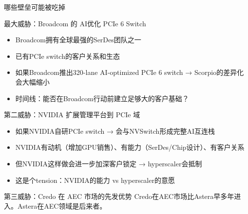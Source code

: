 \documentclass[UTF8,11pt,aspectratio=169]{beamer}
\begin{document}
\begin{frame}{哪些壁垒可能被吃掉}
    \begin{alertblock}{最大威胁：Broadcom 的 AI优化 PCIe 6 Switch}
        \begin{itemize}
            \item Broadcom拥有全球最强的SerDes团队之一
            \item 已有PCIe switch的客户关系和生态
            \item 如果Broadcom推出320-lane AI-optimized PCIe 6 switch → Scorpio的差异化会大幅缩小
            \item 时间线：能否在Broadcom行动前建立足够大的客户基础？
        \end{itemize}
    \end{alertblock}

    \begin{alertblock}{第二威胁：NVIDIA 扩展管理平台到 PCIe 域}
        \begin{itemize}
            \item 如果NVIDIA自研PCIe switch → 会与NVSwitch形成完整AI互连栈
            \item NVIDIA有动机（增加GPU销售）、有能力（SerDes/Chip设计）、有客户关系
            \item 但NVIDIA这样做会进一步加深客户锁定 → hyperscaler会抵制
            \item 这是个tension：NVIDIA的能力 vs hyperscaler的意愿
        \end{itemize}
    \end{alertblock}

    \begin{block}{第三威胁：Credo 在 AEC 市场的先发优势}
        Credo在AEC市场比Astera早多年进入。Astera在AEC领域是后来者。
    \end{block}
\end{frame}

\end{document}
